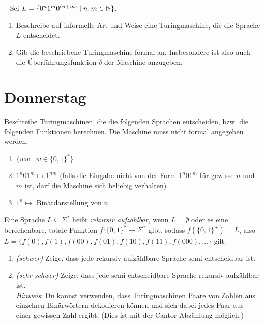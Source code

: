 \documentclass{uebung_cs}
\begin{document}
\begin{aufgabe}\
	Sei $L = \{0^n 1^m 0^{(n+m)} \;|\; n,m \in \mathbb{N}\}$.
	\begin{enumerate}
		\item Beschreibe auf informelle Art und Weise eine Turingmaschine, die die Sprache $L$ entscheidet.
		\item Gib die beschriebene Turingmaschine formal an. Insbesondere ist also auch die Überführungsfunktion $\delta$ der Maschine anzugeben.		
	\end{enumerate}
\end{aufgabe}

\section*{Donnerstag}

\begin{aufgabe}[Turingmaschinen IV]
	Beschreibe Turingmaschinen, die die folgenden Sprachen entscheiden, bzw. die folgenden Funktionen berechnen. Die Maschine muss nicht formal angegeben werden.
	\begin{enumerate}
		\item $\{ww \;|\; w \in \{0,1\}^*\}$
		\item $1^n 0 1^m \mapsto 1^{nm}$ (falls die Eingabe nicht von der Form $1^n 0 1^m$ für gewisse $n$ und $m$ ist, darf die Maschine sich beliebig verhalten)
		\item $1^n \mapsto$ Binärdarstellung von $n$
	\end{enumerate}
\end{aufgabe}

\begin{aufgabe}
	Eine Sprache $L \subseteq \Sigma^*$ heißt \emph{rekursiv aufzählbar}, wenn $L = \emptyset$ oder es eine berechenbare, totale Funktion $f \colon \{0,1\}^* \rightarrow \Sigma^*$ gibt, sodass $f(\{0,1\}^+) = L$, also $L = \{f(0), f(1), f(00), f(01), f(10), f(11), f(000), \dots\}$ gilt.
	\begin{enumerate}
		\item \emph{(schwer)} Zeige, dass jede rekursiv aufzählbare Sprache semi-entscheidbar ist.
		\item \emph{(sehr schwer)} Zeige, dass jede semi-entscheidbare Sprache rekursiv aufzählbar ist.\\
    \emph{Hinweis}: Du kannst verwenden, dass Turingmaschinen Paare von Zahlen aus einzelnen Binärwörtern dekodieren können und sich dabei jedes Paar aus einer gewissen Zahl ergibt.
    (Dies ist mit der Cantor-Abzählung möglich.)
	\end{enumerate}
\end{aufgabe}
\end{document}
